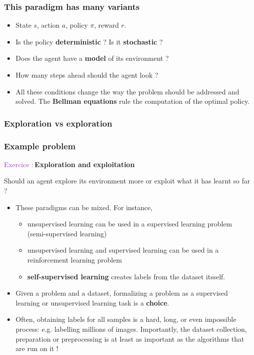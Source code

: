 \documentclass[usenames,dvipsnames]{beamer}
\newcounter{numexos}%
\newcommand{\exercice}[1]{%
\addtocounter{numexos}{1}%
\textcolor{DarkOrchid}{Exercice\,\thenumexos\,:}\,#1%
}
\begin{document}
\begin{frame}
\frametitle{This paradigm has many variants}
\begin{itemize}
	\item 	State $s$, action $a$, policy $\pi$, reward $r$.
	\item	Is the policy \textbf{deterministic }? Is it \textbf{stochastic } ? 
	\item	Does the agent have a \textbf{model} of its environment ? 
	\item	How many steps ahead should the agent look ? 
	\item	All these conditions change the way the problem should be addressed and solved. The \textbf{Bellman equations} rule the computation of the optimal policy.
\end{itemize}
\end{frame}

\subsubsection{Exploration vs exploration} %
\label{ssub:exploration_vs_exploration}

\begin{frame}
\frametitle{Example problem}
\exercice{\textbf{Exploration and exploitation}}

	Should an agent explore its environment more or exploit what it has learnt so far ?
\end{frame}


\begin{frame}
\begin{itemize}
	\item These paradigms can be mixed. For instance,
	\begin{itemize}
		\item unsupervised learning can be used in a supervised learning problem (semi-supervised learning)
		\item unsupervised learning and supervised learning can be used in a reinforcement learning problem
		\item \textbf{self-supervised learning} creates labels from the dataset itsself. 
	\end{itemize}
	\item Given a problem and a dataset, formalizing a problem as a supervised learning or unsupervised learning task is a \textbf{choice}.
	\item Often, obtaining labels for all samples is a hard, long, or even impossible process: e.g. labelling millions of images. Importantly, the dataset collection, preparation or preprocessing is at least as important as the algorithms that are run on it !
\end{itemize}
\end{frame}
\end{document}
